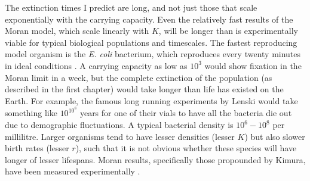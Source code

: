 The extinction times I predict are long, and not just those that scale exponentially with the carrying capacity. %
Even the relatively fast results of the Moran model, which scale linearly with $K$, will be longer than is experimentally viable for typical biological populations and timescales. 
The fastest reproducing model organism is the \emph{E. coli} bacterium, which reproduces every twenty minutes in ideal conditions \cite{Lenski1991,Brock2006}. 
A carrying capacity as low as $10^3$ would show fixation in the Moran limit in a week, but the complete extinction of the population (as described in the first chapter) would take longer than life has existed on the Earth. %
For example, the famous long running experiments by Lenski \cite{Lenski1991} would take something like $10^{10^8}$ years for one of their vials to have all the bacteria die out due to demographic fluctuations. 
A typical bacterial density is $10^6 - 10^8$ per millilitre. 
Larger organisms tend to have lesser densities (lesser $K$) but also slower birth rates (lesser $r$), such that it is not obvious whether these species will have longer of lesser lifespans. 
Moran results, specifically those propounded by Kimura, have been measured experimentally \cite{Kimura1980,Kimura1983}. 

